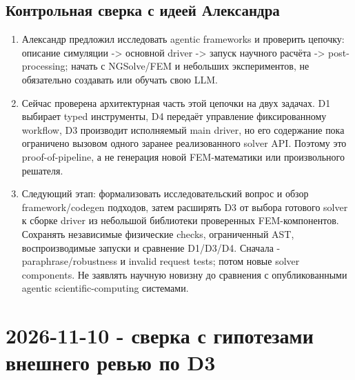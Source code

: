 \documentclass[11pt,a4paper]{article}
\begin{document}
\subsection{Контрольная сверка с идеей Александра}

\begin{enumerate}
    \item Александр предложил исследовать agentic frameworks и проверить цепочку: описание симуляции -> основной driver -> запуск научного расчёта -> post-processing; начать с NGSolve/FEM и небольших экспериментов, не обязательно создавать или обучать свою LLM.
    \item Сейчас проверена архитектурная часть этой цепочки на двух задачах. D1 выбирает typed инструменты, D4 передаёт управление фиксированному workflow, D3 производит исполняемый main driver, но его содержание пока ограничено вызовом одного заранее реализованного solver API. Поэтому это proof-of-pipeline, а не генерация новой FEM-математики или произвольного решателя.
    \item Следующий этап: формализовать исследовательский вопрос и обзор framework/codegen подходов, затем расширять D3 от выбора готового solver к сборке driver из небольшой библиотеки проверенных FEM-компонентов. Сохранять независимые физические checks, ограниченный AST, воспроизводимые запуски и сравнение D1/D3/D4. Сначала - paraphrase/robustness и invalid request tests; потом новые solver components. Не заявлять научную новизну до сравнения с опубликованными agentic scientific-computing системами.
\end{enumerate}

\section{2026-11-10 - сверка с гипотезами внешнего ревью по D3}
\end{document}
